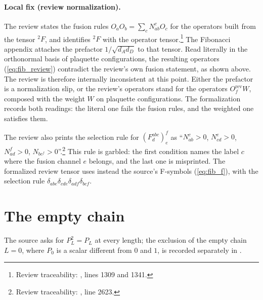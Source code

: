 \documentclass{article}
\begin{document}
\paragraph{Local fix (review normalization).}
The review states the fusion rules $O_aO_b=\sum_cN_{ab}^cO_c$ for the operators
built from the tensor ${}^2\!F$, and identifies ${}^2\!F$ with the operator
tensor.\footnote{Review traceability:
    , lines 1309 and 1341.}
The Fibonacci appendix attaches the prefactor $1/\sqrt{d_Ad_D}$ to that
tensor. Read literally in the orthonormal basis of plaquette configurations,
the resulting operators (\ref{eq:fib_review}) contradict the review's own fusion
statement, as shown above. The review is therefore internally inconsistent at
this point. Either the prefactor is a normalization slip, or the review's
operators stand for the operators $O_f^{\mathrm{rev}}W$, composed with the
weight $W$ on plaquette configurations. The formalization records both readings: the literal one fails the fusion rules,
and the weighted one satisfies them.

The review also prints the selection rule for $(F^{abc}_d)^f_e$ as
``$N_{ab}^c>0$, $N_{cd}^e>0$, $N_{ad}^f>0$, $N_{bc^f}>0$''.\footnote{Review
    traceability: , line 2623.}
This rule is garbled: the first condition names the label $c$ where the
fusion channel $e$ belongs, and the last one is misprinted. The formalized review tensor uses instead the source's F-symbols
(\ref{eq:fib_f}), with the selection rule
$\delta_{abe}\delta_{cde}\delta_{adf}\delta_{bcf}$.

\section{The empty chain}
The source asks for $P_L^2=P_L$ at every length; the exclusion of the empty
chain $L=0$, where $P_0$ is a scalar different from $0$ and $1$, is recorded
separately in .



\end{document}

